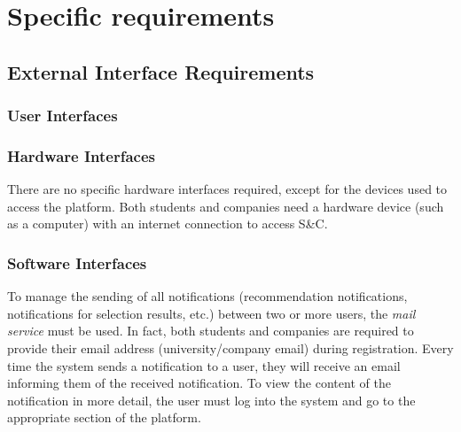 



\chapter{Specific requirements}
	\section{External Interface Requirements}
		\subsection{User Interfaces}
		\subsection{Hardware Interfaces}
			There are no specific hardware interfaces required, except for the devices used to access the platform. Both students and companies need a hardware device (such as a computer) with an internet connection to access S\&C.
		\subsection{Software Interfaces}
				To manage the sending of all notifications (recommendation notifications, notifications for selection results, etc.) between two or more users, the \textit{mail service} must be used. In fact, both students and companies are required to provide their email address (university/company email) during registration. Every time the system sends a notification to a user, they will receive an email informing them of the received notification. To view the content of the notification in more detail, the user must log into the system and go to the appropriate section of the platform.
				
